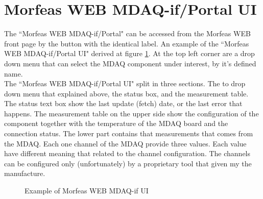 \section{Morfeas WEB MDAQ-if/Portal UI}

The ``Morfeas WEB MDAQ-if/Portal" can be accessed from the Morfeas WEB front page by the button with the identical label.
An example of the ``Morfeas WEB MDAQ-if/Portal UI" derived at figure \ref{fig:MDAQ-if_UI}.
At the top left corner are a drop down menu that can select the MDAQ component under interest, by it's defined name.\\

\noindent The ``Morfeas WEB MDAQ-if/Portal UI" split in three sections.
The to drop down menu that explained above, the status box, and the measurement table.
The status text box show the last update (fetch) date, or the last error that happens.
The measurement table on the upper side show the configuration of the component together with the temperature of the MDAQ board and the connection status.
The lower part contains that measurements that comes from the MDAQ.
Each one channel of the MDAQ provide three values. Each value have different meaning that related to the channel configuration.
The channels can be configured only (unfortunately) by a proprietary tool that given my the manufacture.

\begin{figure}[h]
\centering
	\caption{Example of Morfeas WEB MDAQ-if UI}
	\label{fig:MDAQ-if_UI}
\end{figure}